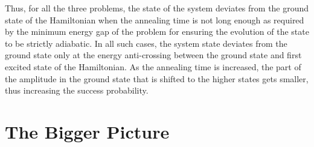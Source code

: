 \documentclass[../main.tex]{subfiles}
\begin{document}
Thus, for all the three problems, the state of the system deviates from the ground  state of the Hamiltonian when the annealing time is not long enough as required by the minimum energy gap of the problem for ensuring the evolution of the state to be strictly adiabatic. In all such cases, the system state deviates from the ground state only at the energy anti-crossing between the ground state and first excited state of the Hamiltonian. As the annealing time is increased, the part of the amplitude in the ground state that is shifted to the higher states gets smaller, thus increasing the success probability.

\section{The Bigger Picture}
\end{document}
